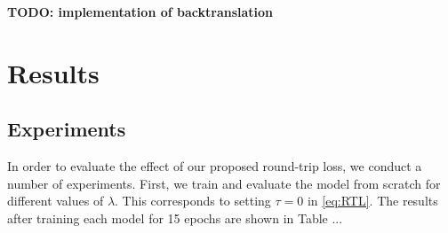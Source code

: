 \documentclass[11pt,a4paper]{article}
\begin{document}


\textbf{TODO: implementation of backtranslation}

\section{Results}\label{sec:results}
\subsection{Experiments}
In order to evaluate the effect of our proposed round-trip loss, we conduct a number of experiments. First, we train and evaluate the model from scratch for different values of $\lambda$. This corresponds to setting $\tau=0$ in \eqref{eq:RTL}. The results after training each model for 15 epochs are shown in Table ...
\end{document}
